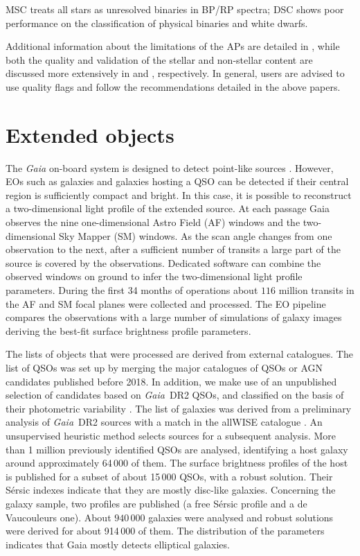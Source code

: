 \documentclass[longauth]{aa}
\newcommand\gaia{\textit{Gaia}\xspace}
\providecommand\gdrtwo{\textit{Gaia}~DR2\xspace}
\begin{document}
 MSC treats all stars as unresolved binaries in BP/RP spectra; 
 DSC shows poor performance on the classification of physical binaries and white dwarfs.
   
Additional information about the limitations of the APs are detailed in \cite{DR3-DPACP-127}, while both the quality and validation of the stellar and non-stellar content are discussed more extensively in \cite{DR3-DPACP-160} and \cite{DR3-DPACP-158}, respectively. In general, users are advised to use quality flags and follow the recommendations detailed in the above papers.

\section{Extended objects}\label{ssec:extended}

The \gaia on-board system is designed to detect point-like sources \citep{2015AA...576A..74D}. However, EOs such as galaxies and galaxies hosting a QSO can be detected  if their central region is  sufficiently compact and bright. In this case, it is possible to reconstruct a two-dimensional light profile of the extended source. At each passage Gaia observes the nine one-dimensional Astro Field (AF) windows and the two-dimensional Sky Mapper (SM) windows. As the scan angle changes from one observation to the next, after a sufficient number of transits a large part of the source is covered by the observations. Dedicated software can combine the observed windows   on ground to infer the two-dimensional light profile parameters.  
During the first 34 months of operations about $116$ million transits in the AF and SM focal planes were collected and processed. The EO pipeline compares the observations with a large number of simulations of galaxy images deriving the best-fit  surface brightness profile parameters.

The lists of objects that were processed are derived from external catalogues.
The list of QSOs was set up by merging  the  major catalogues of QSOs or AGN candidates published before 2018. In addition, we make use of an unpublished selection of candidates based on \gdrtwo QSOs, and classified on the basis of  their photometric variability \citep{2019A&A...625A..97R}. The list of galaxies was derived from a preliminary analysis  of \gdrtwo sources with a match  in the allWISE catalogue \citep{allWISE}. An unsupervised heuristic method \citep{2022Krone-Martins}  selects  sources for a subsequent analysis.
More than 1 million  previously identified  QSOs are analysed,  identifying a host galaxy around  approximately 64\,000 of them. The surface brightness profiles of the host is published for a subset of about 15\,000 QSOs, with a robust solution.
 Their S\'{e}rsic indexes indicate that they are mostly disc-like galaxies. 
Concerning the galaxy sample, two profiles are published (a free S\'{e}rsic profile and a de Vaucouleurs one).  About $940\,000$ galaxies were analysed and robust solutions were derived for about 914\,000 of them. The distribution of the parameters indicates that Gaia mostly detects elliptical galaxies.
\end{document}
